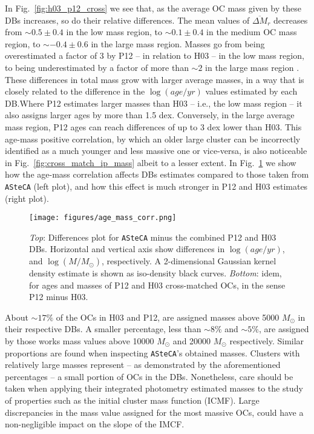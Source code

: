 \documentclass{aa}
\begin{document}
In Fig.~\ref{fig:h03_p12_cross} we see that, as the average OC mass given by
these DBs increases, so do their relative differences.
The mean values of $\overline{\Delta M}_r$ decreases from ${\sim}0.5\pm0.4$ in
the low mass region, to ${\sim}0.1\pm0.4$ in the medium OC mass region, to
${\sim-}0.4\pm0.6$ in the large mass region. Masses go from being overestimated
a factor of 3 by P12 -- in relation to H03 -- in the low mass region, to being
underestimated by a factor of more than ${\sim}2$ in the large mass region .
%
These differences in total mass grow with larger average masses, in a way that
is closely related to the difference in the $\log(age/yr)$ values estimated by
each DB.\@ Where P12 estimates larger masses than H03 -- i.e., the low mass
region -- it also assigns larger ages by more than 1.5 dex. Conversely, in the
large average mass region, P12 ages can reach differences of up to 3 dex lower
than H03.
%
This age-mass positive correlation, by which an older large cluster can be
incorrectly identified as a much younger and less massive one or vice-versa, is
also noticeable in Fig.~\ref{fig:cross_match_ip_mass} albeit to a lesser
extent. In Fig.~\ref{fig:age_mass_corr} we show how the age-mass correlation
affects DBs estimates compared to those taken from \texttt{ASteCA} (left plot),
and how this effect is much stronger in P12 and H03 estimates (right plot).

\begin{figure}
\centering
\texttt{[image: figures/age\_mass\_corr.png]}
\caption{\emph{Top}: Differences plot for \texttt{ASteCA} minus the combined P12
and H03 DBs. Horizontal and vertical axis show differences in
$\log(age/yr)$, and $\log(M/M_{\odot})$, respectively.
A 2-dimensional Gaussian kernel density estimate is shown as iso-density black
curves.
\emph{Bottom}: idem, for ages and masses of P12 and H03 cross-matched OCs, in
the sense P12 minus H03.}
\label{fig:age_mass_corr}
\end{figure}

About ${\sim}17\%$ of the OCs in H03 and P12, are assigned masses
above 5000 $M_{\odot}$ in their respective DBs. A smaller percentage,
less than ${\sim}8\%$ and ${\sim}5\%$, are assigned by those works mass values
above 10000 $M_{\odot}$ and 20000 $M_{\odot}$ respectively. Similar proportions
are found when inspecting \texttt{ASteCA}'s obtained masses.
%
Clusters with relatively large masses represent -- as demonstrated by
the aforementioned percentages -- a small portion of OCs in the DBs.
Nonetheless, care should be taken when applying their integrated photometry
estimated masses to the study of properties such as the initial cluster
mass function (ICMF).
Large discrepancies in the mass value assigned for the most massive OCs, could
have a non-negligible impact on the slope of the IMCF.\@
\end{document}
